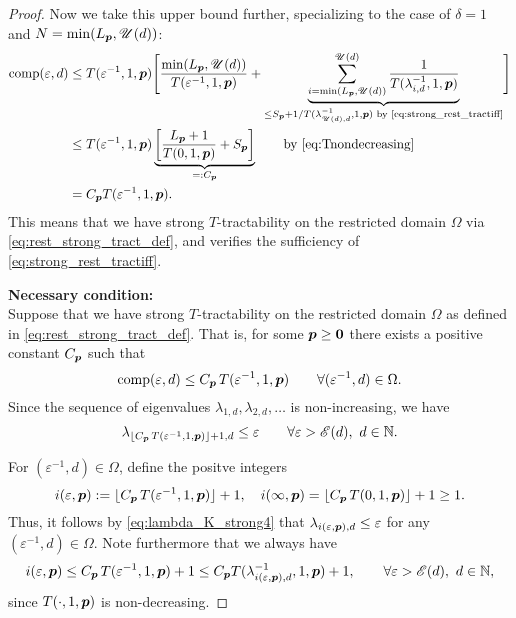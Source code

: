 \documentclass[sort&compress]{elsarticle}
\newcommand{\thed}{\delta}
\newcommand{\theM}{\mathscr{E}}
\newcommand{\theUB}{\mathscr{U}}
\newcommand{\peter}[1]{\begingroup\color{purple}#1\endgroup}
\begin{document}
\begin{proof}
Now we take this upper bound further, specializing to the case of $\thed=1$ and $N = \min(L_{\vp},\theUB(d))$:
\begin{align*}
       \comp(\varepsilon,d)
       & \le T(\varepsilon^{-1},1, \vp) \Biggl [ \frac{\min(L_{\vp},\theUB(d))}{T(\varepsilon^{-1},1, \vp)}  + \underbrace{\sum_{i = \min(L_{\vp},\theUB(d))}^{\theUB(d)} \frac{1}{T(\lambda_{i, d}^{-1},1,\vp)}}_{\le S_{\vp} + 1/ T(\lambda_{\theUB(d), d}^{-1},1,\vp) \text{ by \eqref{eq:strong_rest_tractiff}} }
        \Biggr] \\
       & \le T(\varepsilon^{-1},1,\vp) \underbrace{\left[\frac{L_{\vp}+1}{T(0,1, \vp)} + S_{\vp} \right]}_{=:C_{\vp}}
       \qquad \text{by \eqref{eq:Tnondecreasing}}\\
       & =  C_{\vp}T(\varepsilon^{-1},1,\vp).
\end{align*}
This means that we have strong $T$-tractability on the restricted domain $\Omega$ via \eqref{eq:rest_strong_tract_def}, and verifies the sufficiency of \eqref{eq:strong_rest_tractiff}.



\bigskip
\noindent \textbf{Necessary condition:} \\
Suppose that we have strong
$T$-tractability on the restricted domain $\Omega$ as defined in \eqref{eq:rest_strong_tract_def}. That is, for some $\boldsymbol{p} \ge \boldsymbol{0}$ there exists a positive constant $C_{\boldsymbol{p}}$ such that
\[
\operatorname{comp}(\varepsilon,d)\le C_{\boldsymbol{p}}\, T(\varepsilon^{-1},1,\boldsymbol{p})
\qquad \forall (\varepsilon^{-1}, d) \in \Omega.
\]
Since the sequence of eigenvalues $\lambda_{1,d}, \lambda_{2,d}, \ldots $ is non-increasing, we have
\begin{equation}\label{eq:lambda_K_strong4}
\lambda_{\lfloor C_{\vp}\, T(\varepsilon^{-1},1,\vp)\rfloor +1,d}\le \varepsilon \qquad \forall \varepsilon > \theM(d), \ d \in \mathbb{N}.
\end{equation}

For $(\varepsilon^{-1}, d) \in \Omega$, define the positve integers
\[
i(\varepsilon,\boldsymbol{p}):= \lfloor C_{\boldsymbol{p}}\, T(\varepsilon^{-1},1,\boldsymbol{p})\rfloor +1, \quad
i(\infty,\boldsymbol{p}) =  \lfloor C_{\boldsymbol{p}}\, T(0,1,\boldsymbol{p})\rfloor +1 \ge 1 . 
\]
Thus, it follows by \peter{\eqref{eq:lambda_K_strong4}} that $\lambda_{i(\varepsilon,\boldsymbol{p}),d} \le \varepsilon$
for any  $(\varepsilon^{-1}, d) \in \Omega$.
Note furthermore that we always have
\[
i(\varepsilon,\vp)\le C_{\vp}\, T(\varepsilon^{-1},1,\vp)+1 \le C_{\vp} T(\lambda_{i(\varepsilon,\vp),d}^{-1},1,\vp)+1, \qquad  \forall \varepsilon > \theM(d), \ d \in \mathbb{N},
\]
since
$T(\cdot,1, \boldsymbol{p})$ is non-decreasing.


\end{proof}
\end{document}
